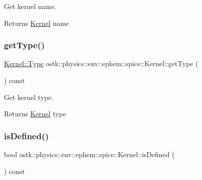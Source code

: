 Get kernel name. 

\begin{DoxyReturn}{Returns}
\hyperlink{classostk_1_1physics_1_1env_1_1ephem_1_1spice_1_1_kernel}{Kernel} name 
\end{DoxyReturn}
\mbox{\label{classostk_1_1physics_1_1env_1_1ephem_1_1spice_1_1_kernel_a4b592a8ad9e7dd8c44807b53afafaf3b}} 
\subsubsection{\texorpdfstring{get\+Type()}{getType()}}
{\footnotesize\ttfamily \hyperlink{classostk_1_1physics_1_1env_1_1ephem_1_1spice_1_1_kernel_a76d560bbface15a0cb24cd82e9a93d77}{Kernel\+::\+Type} ostk\+::physics\+::env\+::ephem\+::spice\+::\+Kernel\+::get\+Type (\begin{DoxyParamCaption}{ }\end{DoxyParamCaption}) const}



Get kernel type. 

\begin{DoxyReturn}{Returns}
\hyperlink{classostk_1_1physics_1_1env_1_1ephem_1_1spice_1_1_kernel}{Kernel} type 
\end{DoxyReturn}
\mbox{\label{classostk_1_1physics_1_1env_1_1ephem_1_1spice_1_1_kernel_a06668d90a8b74338de4863880d362239}} 
\subsubsection{\texorpdfstring{is\+Defined()}{isDefined()}}
{\footnotesize\ttfamily bool ostk\+::physics\+::env\+::ephem\+::spice\+::\+Kernel\+::is\+Defined (\begin{DoxyParamCaption}{ }\end{DoxyParamCaption}) const}



